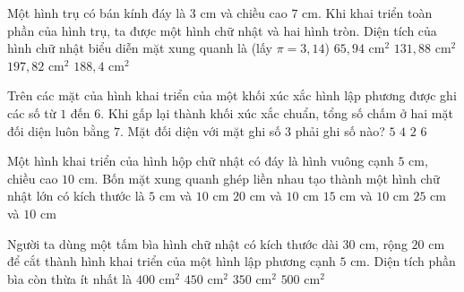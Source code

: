 \begin{ex} %
Một hình trụ có bán kính đáy là $3\text{ cm}$ và chiều cao $7\text{ cm}$. Khi khai triển toàn phần của hình trụ, ta được một hình chữ nhật và hai hình tròn. Diện tích của hình chữ nhật biểu diễn mặt xung quanh là (lấy $\pi = 3{,}14$)
\choice
{$65{,}94\text{ cm}^2$}
{\True $131{,}88\text{ cm}^2$}
{$197{,}82\text{ cm}^2$}
{$188{,}4\text{ cm}^2$}
\end{ex}

\begin{ex} %
Trên các mặt của hình khai triển của một khối xúc xắc hình lập phương được ghi các số từ $1$ đến $6$. Khi gấp lại thành khối xúc xắc chuẩn, tổng số chấm ở hai mặt đối diện luôn bằng $7$. Mặt đối diện với mặt ghi số $3$ phải ghi số nào?
\choice
{$5$}
{\True $4$}
{$2$}
{$6$}
\end{ex}

\begin{ex} %
Một hình khai triển của hình hộp chữ nhật có đáy là hình vuông cạnh $5\text{ cm}$, chiều cao $10\text{ cm}$. Bốn mặt xung quanh ghép liền nhau tạo thành một hình chữ nhật lớn có kích thước là
\choice
{$5\text{ cm}$ và $10\text{ cm}$}
{\True $20\text{ cm}$ và $10\text{ cm}$}
{$15\text{ cm}$ và $10\text{ cm}$}
{$25\text{ cm}$ và $10\text{ cm}$}
\end{ex}

\begin{ex} %
Người ta dùng một tấm bìa hình chữ nhật có kích thước dài $30\text{ cm}$, rộng $20\text{ cm}$ để cắt thành hình khai triển của một hình lập phương cạnh $5\text{ cm}$. Diện tích phần bìa còn thừa ít nhất là
\choice
{$400\text{ cm}^2$}
{\True $450\text{ cm}^2$}
{$350\text{ cm}^2$}
{$500\text{ cm}^2$}
\end{ex}

